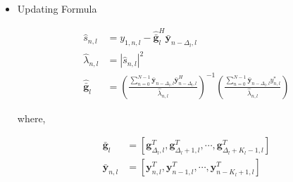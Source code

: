 \documentclass{beamer}
\begin{document}
\frame
{
  \frametitle{\subsecname}
  
  \begin{itemize}
  \item{Updating Formula}

   \begin{align*}
     \hat{s}_{n,l} &= y_{1,n,l} - \hat{\bar{\mathbf{g}}}^H_l \bar{\mathbf{y}}_{n-\Delta_l,l} \\
     \hat{\lambda}_{n,l} &= |\hat{s}_{n,l}|^2 \\
     \hat{\bar{\mathbf{g}}}_l &= \left( \frac{\sum_{n=0}^{N-1}  \bar{\mathbf{y}}_{n-\Delta_l,l} \bar{\mathbf{y}}^H_{n-\Delta_l,l}}{\hat{\lambda}_{n,l}} \right)^{-1}
                                             \left( \frac{\sum_{n=0}^{N-1}  \bar{\mathbf{y}}_{n-\Delta_l,l} y^{*}_{n,l}}{\hat{\lambda}_{n,l}} \right) 
   \end{align*}
   
   where, 
   
    \begin{align*}
     \bar{\mathbf{g}}_l  &= [\mathbf{g}^T_{\Delta_l,l}, \mathbf{g}^T_{\Delta_l+1,l}, \cdots, \mathbf{g}^T_{\Delta_l+K_l-1,l}] \\
     \bar{\mathbf{y}}_{n,l}  &= [\mathbf{y}^T_{n,l}, \mathbf{y}^T_{n-1,l}, \cdots, \mathbf{y}^T_{n-K_l+1,l}] \\
   \end{align*}
   
   \end{itemize}
}
\end{document}
